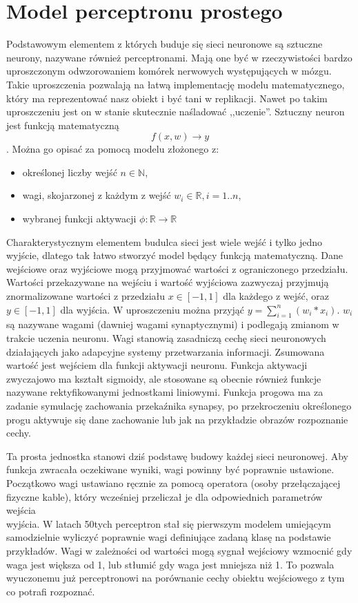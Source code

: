\documentclass[12pt,a4paper,twoside,titlepage,openright]{book}
\begin{document}
\section{Model perceptronu prostego}
Podstawowym elementem z których buduje się sieci neuronowe są sztuczne neurony, nazywane również perceptronami. Mają one być w rzeczywistości bardzo uproszczonym odwzorowaniem komórek nerwowych występujących w mózgu. Takie uproszczenia pozwalają na łatwą implementację modelu matematycznego, który ma reprezentować nasz obiekt i być tani w replikacji. Nawet po takim uproszczeniu jest on w stanie skutecznie naśladować ,,uczenie''.
Sztuczny neuron jest funkcją matematyczną $$f(x,w) \to y$$. Można go opisać za pomocą modelu złożonego z:
\begin{itemize}
\item określonej liczby wejść \(n \in \mathbb{N}\),
\item wagi, skojarzonej z każdym z wejść \(w_i \in \mathbb{R}, i=1..n\),
\item wybranej funkcji aktywacji \(\phi: \mathbb{R} \to \mathbb{R} \)
\end{itemize}

Charakterystycznym elementem budulca sieci jest wiele wejść i tylko jedno wyjście, dlatego tak łatwo stworzyć model będący funkcją matematyczną.
Dane wejściowe oraz wyjściowe mogą przyjmować wartości z ograniczonego przedziału. Wartości przekazywane na wejściu i wartość wyjściowa zazwyczaj przyjmują znormalizowane wartości z przedziału \(x \in [-1, 1]\) dla każdego z wejść, oraz \(y \in [-1,1]\) dla wyjścia. W uproszczeniu można przyjąć \(y = \sum\limits_{i=1}^n (w_i * x_i)\). \(w_i\) są nazywane wagami (dawniej wagami synaptycznymi) i podlegają zmianom w trakcie uczenia neuronu. Wagi stanowią zasadniczą cechę sieci neuronowych działających jako adapcyjne systemy przetwarzania informacji. Zsumowana wartość jest wejściem dla funkcji aktywacji neuronu. Funkcja aktywacji zwyczajowo ma kształt sigmoidy, ale stosowane są obecnie również funkcje nazywane rektyfikowanymi jednostkami liniowymi. Funkcja progowa ma za zadanie symulację zachowania przekaźnika synapsy, po przekroczeniu określonego progu aktywuje się dane zachowanie lub jak na przykładzie obrazów rozpoznanie cechy.

Ta prosta jednostka stanowi dziś podstawę budowy każdej sieci neuronowej. Aby funkcja zwracała oczekiwane wyniki, wagi powinny być poprawnie ustawione. Początkowo wagi ustawiano ręcznie za pomocą operatora (osoby przełączającej fizyczne kable), który wcześniej przeliczał je dla odpowiednich parametrów wejścia\\wyjścia. W latach 50tych perceptron stał się pierwszym modelem umiejącym samodzielnie wyliczyć poprawnie wagi definiujące zadaną klasę na podstawie przykładów. Wagi w zależności od wartości mogą sygnał wejściowy wzmocnić gdy waga jest większa od 1, lub stłumić gdy waga jest mniejsza niż 1. To pozwala wyuczonemu już perceptronowi na porównanie cechy obiektu wejściowego z tym co potrafi rozpoznać.
\end{document}
